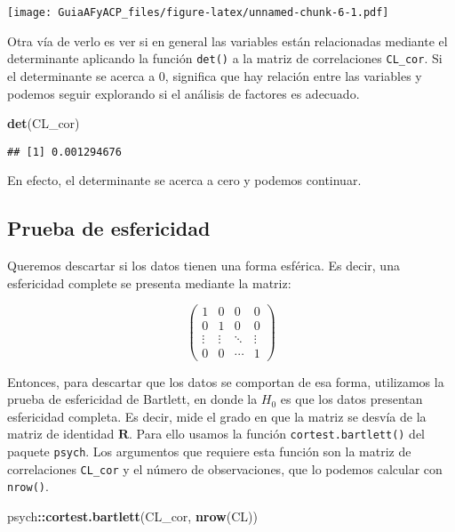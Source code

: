 \documentclass[11pt,spanish,]{article}
\newenvironment{Shaded}{\begin{snugshade}}{\end{snugshade}}
\newcommand{\KeywordTok}[1]{\textcolor[rgb]{0.13,0.29,0.53}{\textbf{#1}}}
\newcommand{\NormalTok}[1]{#1}
\newcommand{\OperatorTok}[1]{\textcolor[rgb]{0.81,0.36,0.00}{\textbf{#1}}}
\begin{document}
\texttt{[image: GuiaAFyACP\_files/figure-latex/unnamed-chunk-6-1.pdf]}

Otra vía de verlo es ver si en general las variables están relacionadas
mediante el determinante aplicando la función \texttt{det()} a la matriz
de correlaciones \texttt{CL\_cor}. Si el determinante se acerca a 0,
significa que hay relación entre las variables y podemos seguir
explorando si el análisis de factores es adecuado.

\begin{Shaded}
\begin{Highlighting}[]
\KeywordTok{det}\NormalTok{(CL_cor)}
\end{Highlighting}
\end{Shaded}

\begin{verbatim}
## [1] 0.001294676
\end{verbatim}

En efecto, el determinante se acerca a cero y podemos continuar.

\hypertarget{prueba-de-esfericidad}{%
\subsection{Prueba de esfericidad}\label{prueba-de-esfericidad}}

Queremos descartar si los datos tienen una forma esférica. Es decir, una
esfericidad complete se presenta mediante la matriz:

\[
\begin{pmatrix}
  1 & 0 & 0 & 0 \\
  0 & 1 & 0 & 0 \\
  \vdots  & \vdots  & \ddots & \vdots  \\
  0 & 0 & \cdots & 1 
 \end{pmatrix}
\]

Entonces, para descartar que los datos se comportan de esa forma,
utilizamos la prueba de esfericidad de Bartlett, en donde la \(H_0\) es
que los datos presentan esfericidad completa. Es decir, mide el grado en
que la matriz se desvía de la matriz de identidad \(\mathbf{R}\). Para
ello usamos la función \texttt{cortest.bartlett()} del paquete
\texttt{psych}. Los argumentos que requiere esta función son la matriz
de correlaciones \texttt{CL\_cor} y el número de observaciones, que lo
podemos calcular con \texttt{nrow()}.

\begin{Shaded}
\begin{Highlighting}[]
\NormalTok{psych}\OperatorTok{::}\KeywordTok{cortest.bartlett}\NormalTok{(CL_cor, }\KeywordTok{nrow}\NormalTok{(CL))}
\end{Highlighting}
\end{Shaded}
\end{document}

